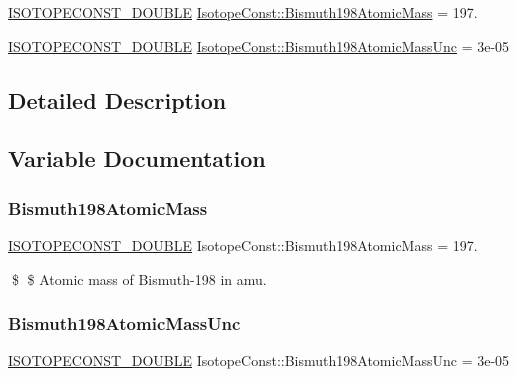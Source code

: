 \begin{DoxyCompactItemize}
\item 
\mbox{\hyperlink{group___isotope_const-_macros_ga8f45a7272ce02c0b4c65c44636ed719a}{I\+S\+O\+T\+O\+P\+E\+C\+O\+N\+S\+T\+\_\+\+D\+O\+U\+B\+LE}} \mbox{\hyperlink{group___isotope_const-_bismuth-_bi198_ga03275f4aa3ecdd71c52fabac0b538238}{Isotope\+Const\+::\+Bismuth198\+Atomic\+Mass}} = 197.
\item 
\mbox{\hyperlink{group___isotope_const-_macros_ga8f45a7272ce02c0b4c65c44636ed719a}{I\+S\+O\+T\+O\+P\+E\+C\+O\+N\+S\+T\+\_\+\+D\+O\+U\+B\+LE}} \mbox{\hyperlink{group___isotope_const-_bismuth-_bi198_gab2a062c801af7ce278e811541de9a945}{Isotope\+Const\+::\+Bismuth198\+Atomic\+Mass\+Unc}} = 3e-\/05
\end{DoxyCompactItemize}


\subsection{Detailed Description}


\subsection{Variable Documentation}
\mbox{\label{group___isotope_const-_bismuth-_bi198_ga03275f4aa3ecdd71c52fabac0b538238}} 
\subsubsection{\texorpdfstring{Bismuth198\+Atomic\+Mass}{Bismuth198AtomicMass}}
{\footnotesize\ttfamily \mbox{\hyperlink{group___isotope_const-_macros_ga8f45a7272ce02c0b4c65c44636ed719a}{I\+S\+O\+T\+O\+P\+E\+C\+O\+N\+S\+T\+\_\+\+D\+O\+U\+B\+LE}} Isotope\+Const\+::\+Bismuth198\+Atomic\+Mass = 197.}

\$ \$ Atomic mass of Bismuth-\/198 in amu. \mbox{\label{group___isotope_const-_bismuth-_bi198_gab2a062c801af7ce278e811541de9a945}} 
\subsubsection{\texorpdfstring{Bismuth198\+Atomic\+Mass\+Unc}{Bismuth198AtomicMassUnc}}
{\footnotesize\ttfamily \mbox{\hyperlink{group___isotope_const-_macros_ga8f45a7272ce02c0b4c65c44636ed719a}{I\+S\+O\+T\+O\+P\+E\+C\+O\+N\+S\+T\+\_\+\+D\+O\+U\+B\+LE}} Isotope\+Const\+::\+Bismuth198\+Atomic\+Mass\+Unc = 3e-\/05}


